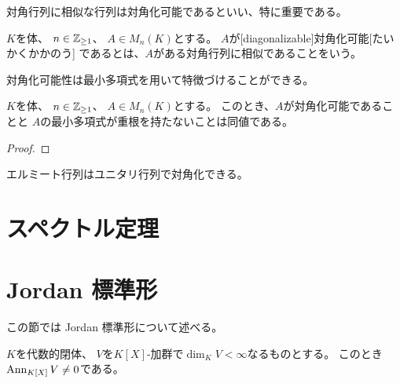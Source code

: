 \documentclass[report]{jlreq}
\begin{document}
対角行列に相似な行列は対角化可能であるといい、特に重要である。

\begin{definition}[対角化可能]
    $K$を体、
    $n \in \mathbb{Z}_{\ge 1}$、
    $A \in M_n(K)$とする。
    $A$が[diagonalizable]{対角化可能}[たいかくかかのう]
    であるとは、$A$がある対角行列に相似であることをいう。
\end{definition}

対角化可能性は最小多項式を用いて特徴づけることができる。

\begin{theorem}[対角化可能性の特徴づけ]
    $K$を体、
    $n \in \mathbb{Z}_{\ge 1}$、
    $A \in M_n(K)$とする。
    このとき、$A$が対角化可能であることと
    $A$の最小多項式が重根を持たないことは同値である。
\end{theorem}

\begin{proof}
    \TODO{}
\end{proof}

エルミート行列はユニタリ行列で対角化できる。

\begin{theorem}[エルミート行列の対角化]
    \TODO{}
\end{theorem}


%
\section{スペクトル定理}

\TODO{}


%
\section{Jordan 標準形}

この節では Jordan 標準形について述べる。

\begin{lemma}
    $K$を代数的閉体、
    $V$を$K[X]$-加群で$\dim_K V < \infty$なるものとする。
    このとき$\operatorname{Ann}_{K[X]} V \neq 0$である。
\end{lemma}
\end{document}
